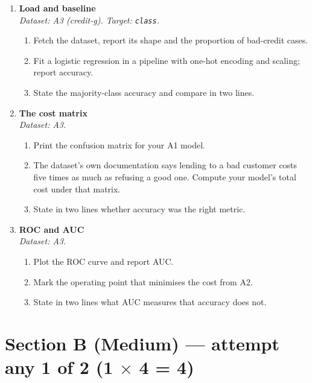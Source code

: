 \documentclass[11pt,a4paper]{article}
\begin{document}
\begin{enumerate}[label=\textbf{A\arabic*.}, leftmargin=*]

  \item \textbf{Load and baseline} \\
    \emph{Dataset: A3 (credit-g). Target: \texttt{class}.}
    \begin{enumerate}[label=(\alph*), leftmargin=*]
      \item Fetch the dataset, report its shape and the proportion of bad-credit cases.
      \item Fit a logistic regression in a pipeline with one-hot encoding and scaling; report accuracy.
      \item State the majority-class accuracy and compare in two lines.
    \end{enumerate}

  \item \textbf{The cost matrix} \\
    \emph{Dataset: A3.}
    \begin{enumerate}[label=(\alph*), leftmargin=*]
      \item Print the confusion matrix for your A1 model.
      \item The dataset's own documentation says lending to a bad customer costs five times as much as refusing a good one. Compute your model's total cost under that matrix.
      \item State in two lines whether accuracy was the right metric.
    \end{enumerate}

  \item \textbf{ROC and AUC} \\
    \emph{Dataset: A3.}
    \begin{enumerate}[label=(\alph*), leftmargin=*]
      \item Plot the ROC curve and report AUC.
      \item Mark the operating point that minimises the cost from A2.
      \item State in two lines what AUC measures that accuracy does not.
    \end{enumerate}

\end{enumerate}

\section*{Section B (Medium) --- attempt any 1 of 2 \quad (1 $\times$ 4 = 4)}
\end{document}
